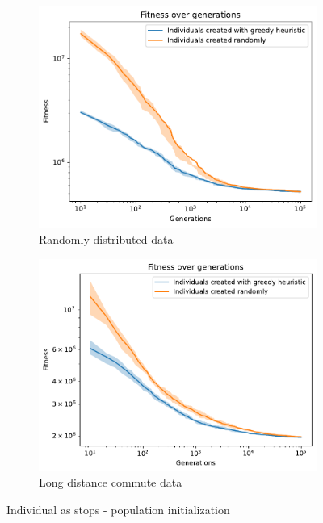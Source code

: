 \begin{figure}[b]
    \centering
    \begin{subfigure}[b]{0.45\textwidth}
        \includegraphics[width=\textwidth]{img/evo1_create_ind_random.pdf}
        \caption{Randomly distributed data}
        \label{fig:evo1_cind_random}
    \end{subfigure}
    \begin{subfigure}[b]{0.45\textwidth}
        \includegraphics[width=\textwidth]{img/evo1_create_ind_commute.pdf}
        \caption{Long distance commute data}
        \label{fig:evo1_cind_commute}
    \end{subfigure}
    \caption{Individual as stops - population initialization}
    \label{fig:evo1_create_ind}
\end{figure}

